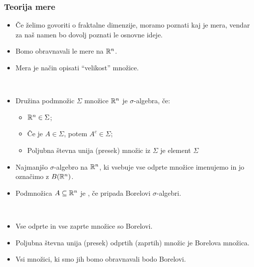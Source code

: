 \subsubsection*{Teorija mere}
\begin{itemize}
    \item Če želimo govoriti o fraktalne dimenzije, moramo poznati kaj je mera, vendar za naš namen bo dovolj poznati le osnovne ideje.
    \item Bomo obravnavali le mere na \(\mathbb{R}^n\).
    \item Mera je način opisati "`velikost"' množice.
\end{itemize}
\begin{definicija} \ 
    \begin{itemize}
        \item Družina podmnožic \(\Sigma\) množice \(\mathbb{R}^n\) je \(\sigma\)-algebra, če:
        \begin{itemize}
            \item \(\mathbb{R}^n \in \Sigma\);
            \item Če je \(A \in \Sigma\), potem \(A^c \in \Sigma\);
            \item Poljubna števna unija (presek) množic iz \(\Sigma\) je element \(\Sigma\)
        \end{itemize}
        \item Najmanjšo \(\sigma\)-algebro na \(\mathbb{R}^n\), ki vsebuje vse odprte množice imenujemo  in jo označimo z \(B(\mathbb{R}^n)\).
        \item Podmnožica \(A \subseteq \mathbb{R}^n\) je \df{Borelova}, če pripada Borelovi \(\sigma\)-algebri.
    \end{itemize}
\end{definicija}

\begin{opomba} \ 
    \begin{itemize}
        \item Vse odprte in vse zaprte množice so Borelovi.
        \item Poljubna števna unija (presek) odprtih (zaprtih) množic je Borelova množica. 
        \item Vsi množici, ki smo jih bomo obravnavali bodo Borelovi.
    \end{itemize}
\end{opomba}

